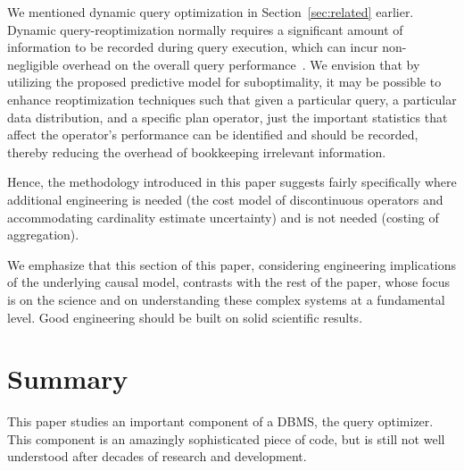 \documentclass[prodmode,acmtods]{acmsmall}
\begin{document}
We mentioned dynamic query optimization in Section~\ref{sec:related}
earlier.  Dynamic query-reoptimization normally requires a significant
amount of information to be recorded during query execution, which can incur
non-negligible overhead on the overall query
performance~\cite{Avnur,kabra98}.  We envision that by utilizing the
proposed predictive model for suboptimality, it may be possible to enhance
reoptimization techniques such that given a particular query, a particular
data distribution, and a specific plan operator, just the important
statistics that affect the operator's performance can be identified and
should be recorded, thereby reducing the overhead of bookkeeping irrelevant
\hbox{information}.

Hence, the methodology introduced in this paper suggests fairly specifically where additional
engineering is needed (the cost model of discontinuous
operators and accommodating cardinality estimate uncertainty) and is not
needed (costing of aggregation).


We emphasize that this section of this paper, considering engineering
implications of the underlying causal model, contrasts with the rest of the
paper, whose focus is on the science and on understanding these complex
systems at a fundamental level.  Good engineering should be built on solid
scientific results.

\section{Summary}\label{sec:summary}

This paper studies an important
component of a \hbox{DBMS}, the query optimizer. This component is an amazingly
sophisticated piece of code, but is still not well understood after decades
of research and development.
\end{document}
